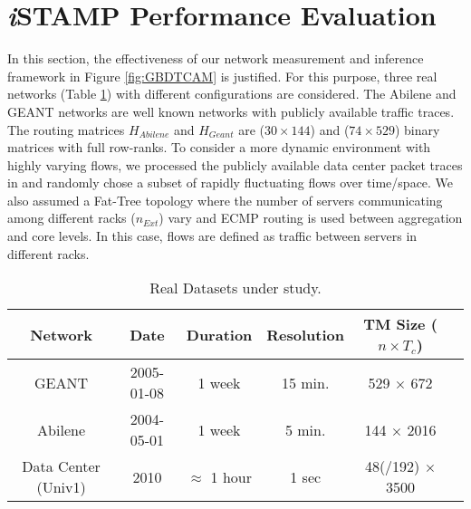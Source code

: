 \section{\textbf{\emph{i}}STAMP Performance Evaluation}   \label{sec:iSTAMPResults}
In this section, the effectiveness of our network measurement and inference framework in Figure \ref{fig:GBDTCAM} is justified. For this purpose, three real networks (Table \ref{tab:DataSetProp}) with different configurations are considered. The Abilene \cite{Abilene} and GEANT \cite{Uhlig:2006} networks are well known networks with publicly available traffic traces. The routing matrices $H_{Abilene}$ and $H_{Geant}$ are ($30\times 144$) and ($74 \times 529$) binary matrices with full row-ranks. To consider a more dynamic environment with highly varying flows, we processed the publicly available data center packet traces in \cite{Benson:2010} and randomly chose a subset of rapidly fluctuating flows over time/space. We also assumed a Fat-Tree topology where the number of servers communicating among different racks ($n_{Ext}$) vary and ECMP routing is used between aggregation and core levels. In this case, flows are defined as traffic between servers in different racks.
\begin{table}[b]
	\centering
 \scriptsize{
 \renewcommand{\tabcolsep}{0.05cm}
 \renewcommand{\arraystretch}{1.0}
		\begin{tabular}{| c | c | c | c | c | c |}
		\hline
     Network  & Date       & Duration  & Resolution   & TM Size ($n \times T_{c}$)              \\ \hline
    \hline
      GEANT \cite{Uhlig:2006}  & 2005-01-08 &  1 week   & 15 min.      & 529 $\times$ 672     \\ \hline
      Abilene \cite{Abilene} & 2004-05-01 &  1 week   &  5 min.      & 144 $\times$ 2016    \\ \hline
      Data Center (Univ1) \cite{Benson:2010}  & 2010 &  $\approx$ 1 hour   & 1 sec      & 48(/192) $\times$ 3500     \\ \hline
    \end{tabular}
	\caption{Real Datasets under study.}
	\label{tab:DataSetProp}
}
\end{table}

